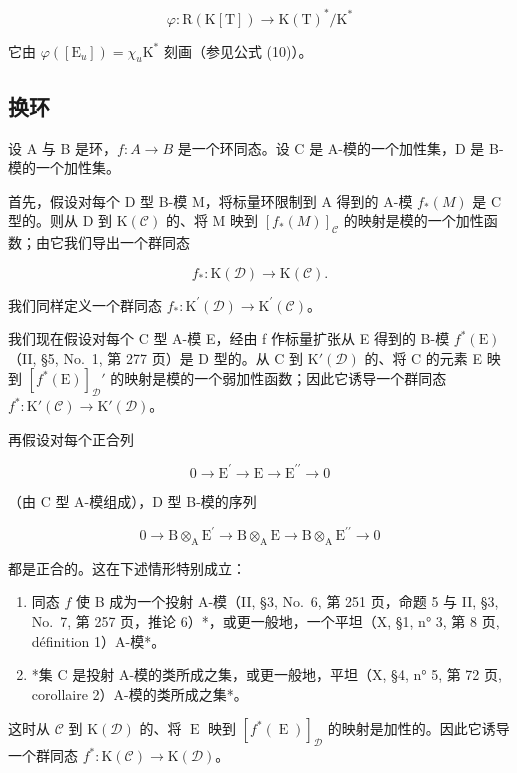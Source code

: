 \[
\varphi : \mathrm{R} (\mathrm{K} [ \mathrm{T} ]) \to \mathrm{K} (\mathrm{T}) ^ {*} / \mathrm{K} ^ {*}
\]

它由 \(\varphi([\mathrm{E}_u]) = \chi_u\mathrm{K}^*\) 刻画（参见公式 (10)）。

\subsection{换环}

设 A 与 B 是环，\(f : A \to B\) 是一个环同态。设 C 是 A-模的一个加性集，D 是 B-模的一个加性集。

首先，假设对每个 D 型 B-模 M，将标量环限制到 A 得到的 A-模 \(f_{*}(M)\) 是 C 型的。则从 D 到 \(\mathrm{K}(\mathcal{C})\) 的、将 M 映到 \([f_{*}(M)]_{\mathcal{C}}\) 的映射是模的一个加性函数；由它我们导出一个群同态

\[
f _ {*}: \mathrm{K} (\mathcal {D}) \longrightarrow \mathrm{K} (\mathcal {C}).
\]

我们同样定义一个群同态 \(f_{*}:\mathrm{K}^{\prime}(\mathcal{D})\to \mathrm{K}^{\prime}(\mathcal{C})\)。

我们现在假设对每个 C 型 A-模 E，经由 f 作标量扩张从 E 得到的 B-模 \(f^{*}(\mathrm{E})\)（II, §5, No.~1, 第 277 页）是 D 型的。从 C 到 \(\mathrm{K}'(\mathcal{D})\) 的、将 C 的元素 E 映到 \([f^{*}(\mathrm{E})]_{\mathcal{D}}'\) 的映射是模的一个弱加性函数；因此它诱导一个群同态 \(f^{*}: \mathrm{K}'(\mathcal{C}) \to \mathrm{K}'(\mathcal{D})\)。

再假设对每个正合列

\[
0 \longrightarrow \mathrm{E} ^ {\prime} \longrightarrow \mathrm{E} \longrightarrow \mathrm{E} ^ {\prime \prime} \longrightarrow 0
\]

（由 C 型 A-模组成），D 型 B-模的序列

\[
0 \longrightarrow \mathrm{B} \otimes_ {\mathrm{A}} \mathrm{E} ^ {\prime} \longrightarrow \mathrm{B} \otimes_ {\mathrm{A}} \mathrm{E} \longrightarrow \mathrm{B} \otimes_ {\mathrm{A}} \mathrm{E} ^ {\prime \prime} \longrightarrow 0
\]

都是正合的。这在下述情形特别成立：

\begin{enumerate}
\def\labelenumi{\alph{enumi})}
\item
  同态 \(f\) 使 B 成为一个投射 A-模（II, §3, No.~6, 第 251 页，命题 5 与 II, §3, No.~7, 第 257 页，推论 6）*，或更一般地，一个平坦（X, §1, n° 3, 第 8 页, définition 1）A-模*。
\item
  *集 C 是投射 A-模的类所成之集，或更一般地，平坦（X, §4, n° 5, 第 72 页, corollaire 2）A-模的类所成之集*。
\end{enumerate}

这时从 \(\mathcal{C}\) 到 \(\mathrm{K}(\mathcal{D})\) 的、将 \(\operatorname{E}\) 映到 \([f^{*}(\operatorname{E})]_{\mathcal{D}}\) 的映射是加性的。因此它诱导一个群同态 \(f^{*}:\mathrm{K}(\mathcal{C})\to \mathrm{K}(\mathcal{D})\)。
